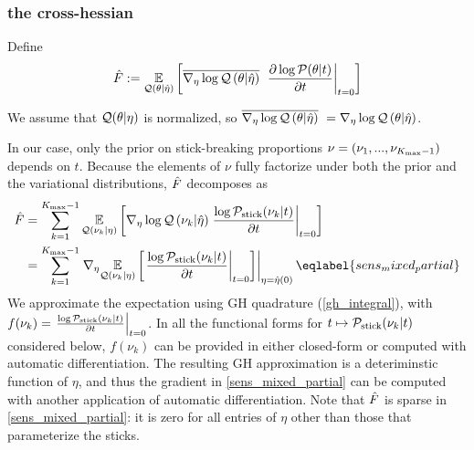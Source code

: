 
\subsubsection*{the cross-hessian}


Define
\begin{align*}
\hat F :=   \underset{\mathcal{Q}(\theta \vert \hat\eta)}{\mathbb{E}}\left[
      \overline{{\nabla_\eta \log \mathcal{Q}}\left(\theta \vert \hat\eta\right)}\,\,
      \left.\frac{\partial \log \mathcal{P}(\theta \vert t)}{\partial t}\right\vert_{t=0}
  \right]
\end{align*}


We assume that $\mathcal{Q}(\theta \vert \eta)$ is normalized, so
$\overline{{\nabla_\eta \log \mathcal{Q}}\left(\theta \vert \hat\eta\right)}\,\, = {\nabla_\eta \log \mathcal{Q}}\left(\theta \vert \hat\eta\right)$.

In our case, only the prior on stick-breaking proportions
$\nu = (\nu_1, ..., \nu_{{K_{\mathrm{max}}} - 1})$ depends on $t$.
Because the elements of $\nu$ fully factorize
under both the prior and the variational distributions,
$\hat F$ decomposes as
\begin{align}
  \crosshessian &=
  \sum_{\k=1}^{\kmax - 1}
          \expect{\q(\nuk \vert \eta)}
                 {
                 \lqgrad{\nuk \vert \etaopt}
                 \fracat{\log \pstick(\nuk \vert \t)}{\partial \t}{\t = 0}
                 } \notag\\
  &= \sum_{\k=1}^{\kmax - 1}
         \evalat{\nabla_\eta \expect{\q(\nuk \vert \eta)}
                {
                \fracat{\log \pstick(\nuk \vert \t)}{\partial \t}{\t = 0}
                }}{\eta = \etaopt(0)}
\eqlabel{sens_mixed_partial}
\end{align}
We approximate the expectation using GH quadrature (\eqref{gh_integral}),
with
$f(\nu_k) = \left.\frac{\log \mathcal{P}_{\mathrm{stick}}(\nu_{k} \vert t)}{\partial t}\right\vert_{t = 0}$.
In all the functional forms for
$t \mapsto \mathcal{P}_{\mathrm{stick}}(\nu_{k} \vert t)$ considered below,
$f(\nu_k)$ can be provided in either closed-form or computed with automatic differentiation.
The resulting GH approximation is a deteriminstic function of $\eta$,
and thus the gradient in \eqref{sens_mixed_partial} can be computed
with another application of automatic differentiation.
Note that $\hat F$ is sparse in \eqref{sens_mixed_partial}:
it is zero for all entries of
$\eta$ other than those that parameterize the sticks.

